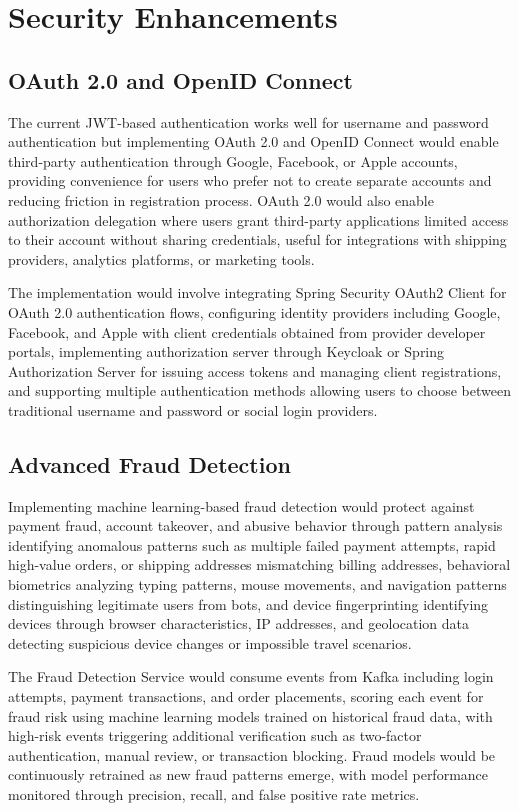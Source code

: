 \section{Security Enhancements}

\subsection{OAuth 2.0 and OpenID Connect}

The current JWT-based authentication works well for username and password authentication but implementing OAuth 2.0 and OpenID Connect would enable third-party authentication through Google, Facebook, or Apple accounts, providing convenience for users who prefer not to create separate accounts and reducing friction in registration process. OAuth 2.0 would also enable authorization delegation where users grant third-party applications limited access to their account without sharing credentials, useful for integrations with shipping providers, analytics platforms, or marketing tools.

The implementation would involve integrating Spring Security OAuth2 Client for OAuth 2.0 authentication flows, configuring identity providers including Google, Facebook, and Apple with client credentials obtained from provider developer portals, implementing authorization server through Keycloak or Spring Authorization Server for issuing access tokens and managing client registrations, and supporting multiple authentication methods allowing users to choose between traditional username and password or social login providers.

\subsection{Advanced Fraud Detection}

Implementing machine learning-based fraud detection would protect against payment fraud, account takeover, and abusive behavior through pattern analysis identifying anomalous patterns such as multiple failed payment attempts, rapid high-value orders, or shipping addresses mismatching billing addresses, behavioral biometrics analyzing typing patterns, mouse movements, and navigation patterns distinguishing legitimate users from bots, and device fingerprinting identifying devices through browser characteristics, IP addresses, and geolocation data detecting suspicious device changes or impossible travel scenarios.

The Fraud Detection Service would consume events from Kafka including login attempts, payment transactions, and order placements, scoring each event for fraud risk using machine learning models trained on historical fraud data, with high-risk events triggering additional verification such as two-factor authentication, manual review, or transaction blocking. Fraud models would be continuously retrained as new fraud patterns emerge, with model performance monitored through precision, recall, and false positive rate metrics.

